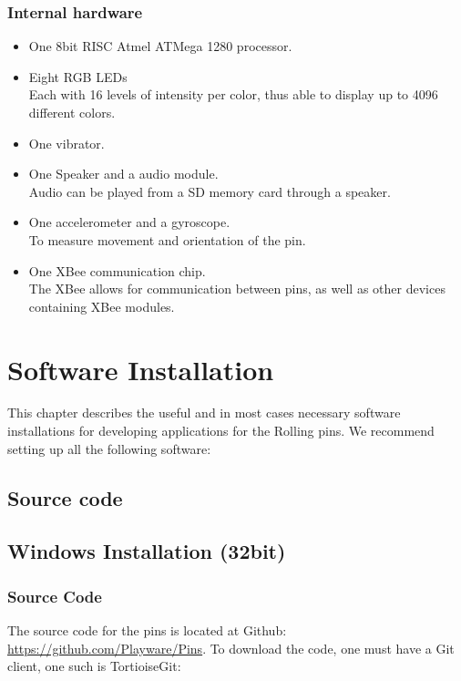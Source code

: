 \documentclass[a4paper, twoside, final]{book}%
\begin{document}
\subsection*{Internal hardware}
\begin{itemize}
\item	One 8bit RISC Atmel ATMega 1280 processor.
\item	Eight RGB LEDs \\
Each with 16 levels of intensity per color, thus able to display up to 4096 different colors.
\item One vibrator.
\item One Speaker and a audio module.\\
Audio can be played from a SD memory card through a speaker.
\item One accelerometer and a gyroscope.\\
To measure movement and orientation of the pin.
\item One XBee communication chip. \\
The XBee allows for communication between pins, as well as other devices containing XBee modules.
\end{itemize}

\mainmatter

\chapter{Software Installation}

This chapter describes the useful and in most cases necessary software installations for developing applications for the Rolling pins. We recommend setting up all the following software:

\section{Source code}

\section{Windows Installation (32bit)}
\label{windows_installation_32bit}

\subsection*{Source Code}
The source code for the pins is located at Github: \url{https://github.com/Playware/Pins}.
To download the code, one must have a Git client, one such is TortioiseGit:
\end{document}
